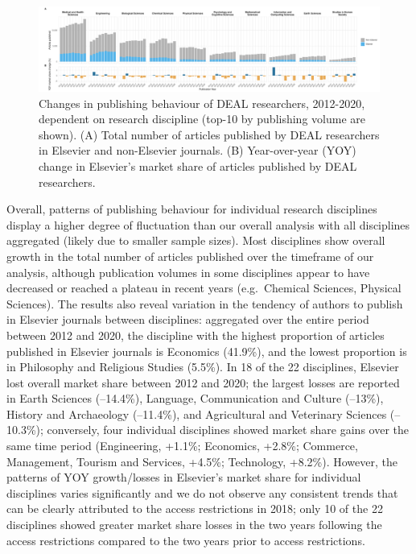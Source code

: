 \documentclass[
]{article}
\begin{document}
\begin{figure}
\centering
\includegraphics{analysis_files/figure-latex/items-publisher-year-category-1.pdf}
\caption{\label{fig:items-publisher-year-category}Changes in publishing behaviour of DEAL researchers, 2012-2020, dependent on research discipline (top-10 by publishing volume are shown). (A) Total number of articles published by DEAL researchers in Elsevier and non-Elsevier journals. (B) Year-over-year (YOY) change in Elsevier's market share of articles published by DEAL researchers.}
\end{figure}

Overall, patterns of publishing behaviour for individual research disciplines display a higher degree of fluctuation than our overall analysis with all disciplines aggregated (likely due to smaller sample sizes). Most disciplines show overall growth in the total number of articles published over the timeframe of our analysis, although publication volumes in some disciplines appear to have decreased or reached a plateau in recent years (e.g.~Chemical Sciences, Physical Sciences). The results also reveal variation in the tendency of authors to publish in Elsevier journals between disciplines: aggregated over the entire period between 2012 and 2020, the discipline with the highest proportion of articles published in Elsevier journals is Economics (41.9\%), and the lowest proportion is in Philosophy and Religious Studies (5.5\%). In 18 of the 22 disciplines, Elsevier lost overall market share between 2012 and 2020; the largest losses are reported in Earth Sciences (--14.4\%), Language, Communication and Culture (--13\%), History and Archaeology (--11.4\%), and Agricultural and Veterinary Sciences (--10.3\%); conversely, four individual disciplines showed market share gains over the same time period (Engineering, +1.1\%; Economics, +2.8\%; Commerce, Management, Tourism and Services, +4.5\%; Technology, +8.2\%). However, the patterns of YOY growth/losses in Elsevier's market share for individual disciplines varies significantly and we do not observe any consistent trends that can be clearly attributed to the access restrictions in 2018; only 10 of the 22 disciplines showed greater market share losses in the two years following the access restrictions compared to the two years prior to access restrictions.
\end{document}
